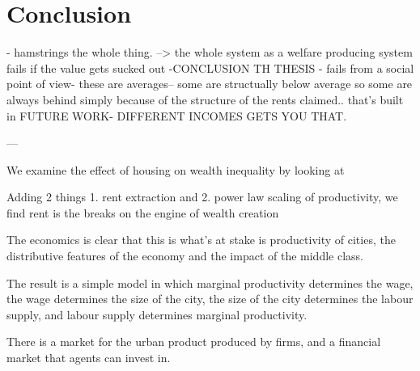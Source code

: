 
\chapter{Conclusion}




- hamstrings the whole thing.
--> the whole system as a welfare producing system fails if the value gets sucked out -CONCLUSION TH THESIS - fails from a social point of view-
these are averages-- some are structually below average so some are always behind simply because of the structure of the rents claimed.. that's built in FUTURE WORK- DIFFERENT INCOMES GETS YOU THAT. 


---


We examine the effect of housing on wealth inequality by looking at 

Adding 2 things 1. rent extraction and 2. power law scaling of productivity, we find rent is the breaks on the engine of wealth creation

The economics is clear that this is what's at stake is productivity of cities, the distributive features of the economy and the impact of the middle class.

The result is a simple model in which marginal productivity determines the wage, the wage determines the size of the city, the size of the city determines the labour supply, and labour supply determines marginal productivity. 

There is a market for the urban product produced by firms, and a financial market that agents can invest in.


